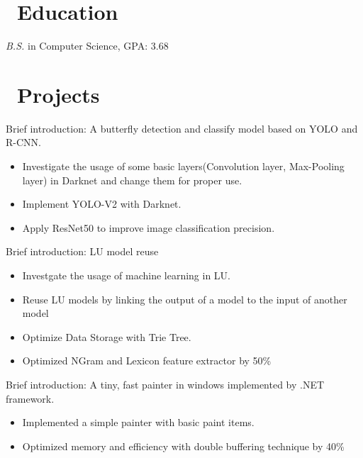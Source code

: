 \documentclass{resume}
\begin{document}



\section{\faGraduationCap\ Education}
\textit{B.S.} in Computer Science, GPA: 3.68

\section{\faUsers\ Projects}

Brief introduction: A butterfly detection and classify model based on YOLO and R-CNN.
\begin{itemize}
	\item Investigate the usage of some basic layers(Convolution layer, Max-Pooling layer) in Darknet and change them for proper use.
  \item Implement YOLO-V2 with Darknet.
	\item Apply ResNet50 to improve image classification precision.
\end{itemize}

Brief introduction: LU model reuse
\begin{itemize}
	\item Investgate the usage of machine learning in LU.
  \item Reuse LU models by linking the output of a model to the input of another model
	\item Optimize Data Storage with Trie Tree.
  \item Optimized NGram and Lexicon feature extractor by 50\%
\end{itemize}

Brief introduction: A tiny, fast painter in windows implemented by .NET framework.
\begin{itemize}
  \item Implemented a simple painter with basic paint items.
  \item Optimized memory and efficiency with double buffering technique by 40\%
\end{itemize}
\end{document}
